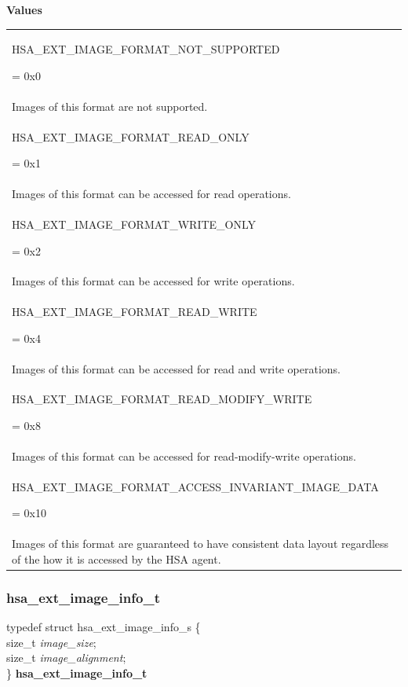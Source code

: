 \documentclass[final]{book}
\newcommand{\reffld}[1]{\textit{#1}}
\newcommand{\reftyp}[1]{#1}
\newcommand{\refenu}[1]{\reftyp{#1}}
\newenvironment{mylongtable}{\rowcolors{0}{lightgray}{lightgray}\longtable} {
\endlongtable}
\begin{document}
\noindent\textbf{Values}\\[-5mm]
\begin{longtable}{@{\hspace{2em}}p{\linewidth-2em}}
\hspace{-2em}\hypertarget{group__images_1ggaef83852ae5fb54b82317e96990da388aaae6fb99314cf823319737bd5b622a2f4}{\refenu{HSA_\-EXT_\-IMAGE_\-FORMAT_\-NOT_\-SUPPORTED}} = 0x0\\Images of this format are not supported.\\[2mm]
\hspace{-2em}\hypertarget{group__images_1ggaef83852ae5fb54b82317e96990da388aa3db3e90538f1fd5a45d7937f9c881b2a}{\refenu{HSA_\-EXT_\-IMAGE_\-FORMAT_\-READ_\-ONLY}} = 0x1\\Images of this format can be accessed for read operations.\\[2mm]
\hspace{-2em}\hypertarget{group__images_1ggaef83852ae5fb54b82317e96990da388aa489215daa4de11d09f2d3c1c8c212fcb}{\refenu{HSA_\-EXT_\-IMAGE_\-FORMAT_\-WRITE_\-ONLY}} = 0x2\\Images of this format can be accessed for write operations.\\[2mm]
\hspace{-2em}\hypertarget{group__images_1ggaef83852ae5fb54b82317e96990da388aaf88802f6e05d969561eccbb0a3f39222}{\refenu{HSA_\-EXT_\-IMAGE_\-FORMAT_\-READ_\-WRITE}} = 0x4\\Images of this format can be accessed for read and write operations.\\[2mm]
\hspace{-2em}\hypertarget{group__images_1ggaef83852ae5fb54b82317e96990da388aa852e4523bdab4f798240af94cc06aa65}{\refenu{HSA_\-EXT_\-IMAGE_\-FORMAT_\-READ_\-MODIFY_\-WRITE}} = 0x8\\Images of this format can be accessed for read-modify-write operations.\\[2mm]
\hspace{-2em}\hypertarget{group__images_1ggaef83852ae5fb54b82317e96990da388aa286344b2349f73e9f92400f589a05f60}{\refenu{HSA_\-EXT_\-IMAGE_\-FORMAT_\-ACCESS_\-INVARIANT_\-IMAGE_\-DATA}} = 0x10\\Images of this format are guaranteed to have consistent data layout regardless of the how it is accessed by the HSA agent.
\end{longtable}

\subsubsection{hsa_\-ext_\-image_\-info_\-t}
\vspace{-5.5mm}\begin{mylongtable}{@{}p{\textwidth}}
typedef struct  hsa_ext_image_info_s \{\\
\hspace{1.7em}size_\-t \reffld{image_\-size};\\
\hspace{1.7em}size_\-t \reffld{image_\-alignment};\\
\}  \hypertarget{group__images_1gac593c25dcf8f579ef2eb18e485d7351e}{\textbf{hsa_\-ext_\-image_\-info_\-t}}
\end{mylongtable}
\end{document}
